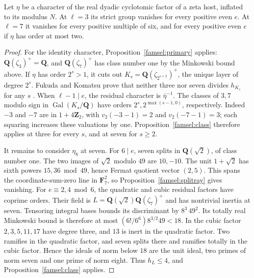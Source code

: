 \begin{proposition}\label{famsel:dyadic}
Let \(\eta\) be a character of the real dyadic cyclotomic factor of a
zeta host, inflated to its modulus \(N\). At \(\ell=3\) its strict group
vanishes for every positive even \(e\). At \(\ell=7\) it vanishes for
every positive multiple of six, and for every positive even \(e\) if
\(\eta\) has order at most two.
\end{proposition}
\begin{proof}
For the identity character, Proposition~\ref{famsel:primary} applies:
\(\mathbf Q(\zeta_3)^+=\mathbf Q\), and \(\mathbf Q(\zeta_7)^+\) has
class number one by the Minkowski bound above.
If \(\eta\) has order \(2^s>1\), it cuts out
\(K_s=\mathbf Q(\zeta_{2^{s+2}})^+\), the unique layer of degree \(2^s\).
Fukuda and Komatsu prove that neither three nor seven divides \(h_{K_s}\)
for any \(s\) \cite[Corollary~1.1]{fukudaKomatsuWeber}. When \(\ell-1\mid e\),
the residual character is \(\bar\eta^{-1}\). The classes of \(3,7\)
modulo sign in \(\operatorname{Gal}(K_s/\mathbf Q)\) have orders
\(2^s,2^{\max(s-1,0)}\), respectively. Indeed \(-3\) and \(-7\) are
in \(1+4\mathbf Z_2\), with \(v_2(-3-1)=2\) and \(v_2(-7-1)=3\);
each squaring increases these valuations by one. Proposition~\ref{famsel:class}
therefore applies at three for every \(s\), and at seven for \(s\ge2\).

It remains to consider \(\eta_8\) at seven. For \(6\mid e\), seven
splits in \(\mathbf Q(\sqrt2)\), of class number one. The two images
of \(\sqrt2\) modulo \(49\) are \(10,-10\). The unit \(1+\sqrt2\) has
sixth powers \(15,36\bmod49\), hence Fermat quotient vector \((2,5)\).
This spans the coordinate-sum-zero line in \(\mathbf F_7^2\), so
Proposition~\ref{famsel:splitray} gives vanishing.
For \(e\equiv2,4\bmod6\), the quadratic and cubic residual factors
have coprime orders. Their field is
\(L=\mathbf Q(\sqrt2)\mathbf Q(\zeta_7)^+\) and has nontrivial inertia
at seven. Tensoring integral bases bounds its discriminant by
\(8^3\,49^2\). Its totally real Minkowski bound is therefore at most
\((6!/6^6)8^{3/2}49<18\). In the cubic factor \(2,3,5,11,17\) have
degree three, and \(13\) is inert in the quadratic factor. Two ramifies
in the quadratic factor, and seven splits there and ramifies totally
in the cubic factor. Hence the ideals of norm below \(18\) are the unit
ideal, two primes of norm seven and one prime of norm eight.
Thus \(h_L\le4\), and Proposition~\ref{famsel:class} applies.
\end{proof}


